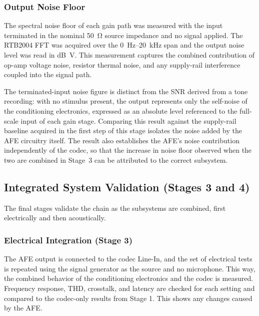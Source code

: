 \subsubsection{Output Noise Floor}

The spectral noise floor of each gain path was measured with the input terminated in the nominal \SI{50}{\ohm} source impedance and no signal applied. The RTB2004 FFT was acquired over the \SI{0}{\hertz}--\SI{20}{\kilo\hertz} span and the output noise level was read in \si{\deci\bel V}. This measurement captures the combined contribution of op-amp voltage noise, resistor thermal noise, and any supply-rail interference coupled into the signal path.

The terminated-input noise figure is distinct from the SNR derived from a tone recording: with no stimulus present, the output represents only the self-noise of the conditioning electronics, expressed as an absolute level referenced to the full-scale input of each gain stage. Comparing this result against the supply-rail baseline acquired in the first step of this stage isolates the noise added by the AFE circuitry itself. The result also establishes the AFE's noise contribution independently of the codec, so that the increase in noise floor observed when the two are combined in Stage~3 can be attributed to the correct subsystem.



\subsection{Integrated System Validation (Stages 3 and 4)}
\label{sec:integrated_system_validation}

The final stages validate the chain as the subsystems are combined, first electrically and then acoustically.




\subsubsection{Electrical Integration (Stage 3)}

The AFE output is connected to the codec Line-In, and the set of electrical tests is repeated using the signal generator as the source and no microphone. This way, the combined behavior of the conditioning electronics and the codec is measured. Frequency response, THD, crosstalk, and latency are checked for each setting and compared to the codec-only results from Stage 1. This shows any changes caused by the AFE. 

